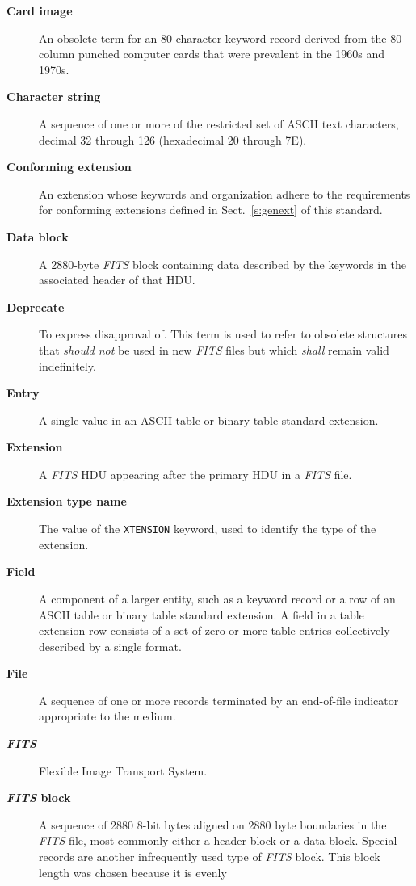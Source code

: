 \documentclass[onecolumn]{aa}
\begin{document}
\begin{description}
\item[\bf Card image]  An obsolete term for an 80-character keyword record
     derived from the 80-column punched computer cards that were prevalent
     in the 1960s and 1970s.
\item[\bf Character string] A sequence of one or more of the restricted set of ASCII text characters,
    decimal 32 through 126 (hexadecimal 20 through 7E). 
\item[\bf Conforming extension] An extension whose keywords and
         organization
         adhere to the requirements for conforming extensions defined 
         in Sect.\ \ref{s:genext} of this 
         standard.
\item[\bf Data block]  A 2880-byte {\em FITS\/} block containing data described by the
         keywords in the associated header of that HDU.
\item[\bf Deprecate]  To express disapproval of. This term is used 
        to refer to obsolete structures that {\em should not} be used in
	new {\em FITS\/} files but which {\em shall} remain valid indefinitely.
\item[\bf Entry] A single value in an ASCII table or  binary table standard extension.
\item[\bf Extension] A {\em FITS\/} HDU 
     appearing after the primary HDU in a 
     {\em FITS\/} file.
\item[\bf Extension type name] The value of the {\tt XTENSION}
   keyword, used to identify
   the type of the extension. 
\item[\bf Field] A component of a larger entity, such as a keyword record or
    a row of an  ASCII table or binary table standard extension.  
    A field in a table extension row consists of a set of zero or more table 
     entries collectively described by a single format.
\item[\bf File] A sequence of one or more records terminated by an end-of-file
             indicator appropriate to the medium.
\item[\bf {\em\bf FITS}] Flexible Image Transport System.
\item[\bf {\em\bf FITS} block] A sequence of 2880 8-bit bytes aligned on 2880 
byte boundaries in the {\em FITS\/} file, most commonly either a header 
block or a data block.  Special records are another infrequently used type
of {\em FITS\/} block.    This block length was chosen because it is evenly

\end{description}
\end{document}
